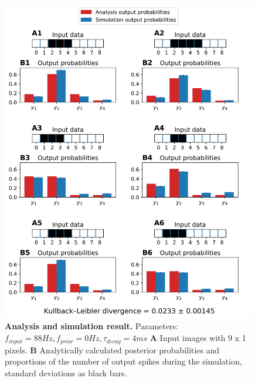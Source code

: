 \begin{figure}
  \includegraphics[width=\linewidth]{figures/1D/1D_88_0_4.png}
   \caption{\textbf{Analysis and simulation result. } Parameters: $f_{input} = 88 Hz, f_{prior} = 0 Hz, \tau_{decay} = 4 ms$ \textbf{A} Input images with 9 x 1 pixels. \textbf{B} Analytically calculated posterior probabilities and proportions of the number of output spikes during the simulation, standard deviations as black bars.}
  \label{fig:1D_88_0_4}
\end{figure}

